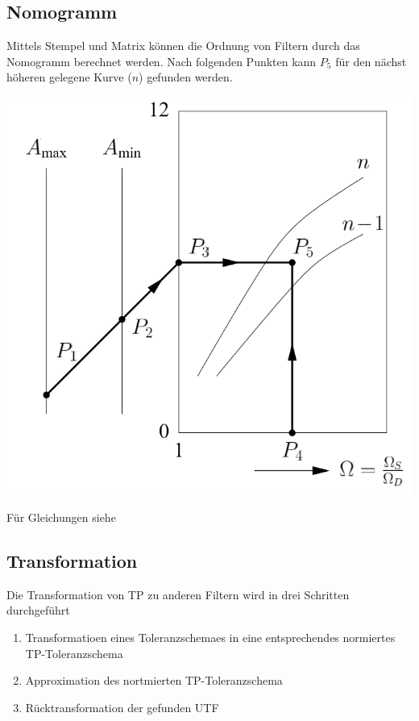 \subsection{Nomogramm}
 Mittels Stempel und Matrix können die Ordnung von Filtern durch das Nomogramm berechnet werden. Nach folgenden Punkten kann $P_5$ für den nächst höheren gelegene Kurve ($n$) gefunden werden.
\begin{center}
	\includegraphics[width=0.6\columnwidth]{Images/nomogramm}
\end{center}
Für Gleichungen siehe 

\subsection{Transformation}
Die Transformation von TP zu anderen Filtern wird in drei Schritten durchgeführt
\begin{enumerate}[nosep]
	\item Transformatioen eines Toleranzschemaes in eine entsprechendes normiertes TP-Toleranzschema
	\item Approximation des nortmierten TP-Toleranzschema
	\item Rücktransformation der gefunden UTF
\end{enumerate}

